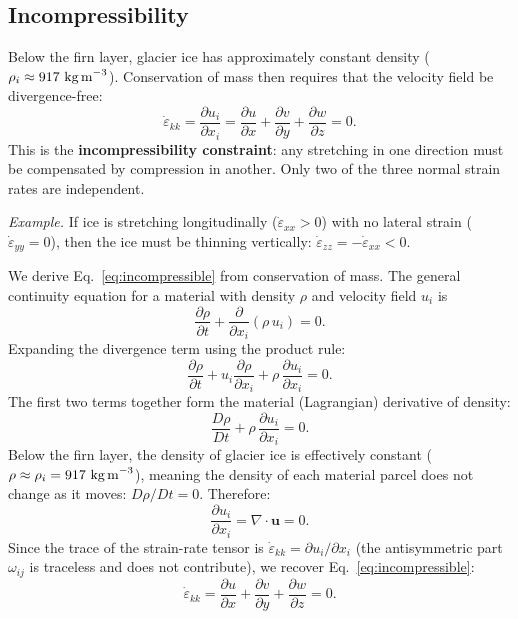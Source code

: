 \documentclass[11pt]{article}
\begin{document}
\subsection{Incompressibility}

Below the firn layer, glacier ice has approximately constant density ($\rho_i \approx 917~\text{kg\,m}^{-3}$).  Conservation of mass then requires that the velocity field be divergence-free:
\begin{equation}
  \boxed{\dot{\varepsilon}_{kk} = \frac{\partial u_i}{\partial x_i} = \frac{\partial u}{\partial x} + \frac{\partial v}{\partial y} + \frac{\partial w}{\partial z} = 0.}
  \label{eq:incompressible}
\end{equation}
This is the \textbf{incompressibility constraint}: any stretching in one direction must be compensated by compression in another.  Only two of the three normal strain rates are independent.

\medskip
\noindent\emph{Example.}  If ice is stretching longitudinally ($\dot{\varepsilon}_{xx} > 0$) with no lateral strain ($\dot{\varepsilon}_{yy} = 0$), then the ice must be thinning vertically: $\dot{\varepsilon}_{zz} = -\dot{\varepsilon}_{xx} < 0$.

\begin{tcolorbox}[
  colback=orange!25,
  colframe=orange!70!black,
  title={\textbf{Derivation: Incompressibility of Glacier Ice}},
  breakable
]
We derive Eq.~\eqref{eq:incompressible} from conservation of mass.  The general continuity equation for a material with density $\rho$ and velocity field $u_i$ is
\begin{equation}
  \frac{\partial \rho}{\partial t} + \frac{\partial}{\partial x_i}(\rho\,u_i) = 0.
\end{equation}
Expanding the divergence term using the product rule:
\begin{equation}
  \frac{\partial \rho}{\partial t} + u_i\frac{\partial \rho}{\partial x_i} + \rho\,\frac{\partial u_i}{\partial x_i} = 0.
\end{equation}
The first two terms together form the material (Lagrangian) derivative of density:
\begin{equation}
  \frac{D\rho}{Dt} + \rho\,\frac{\partial u_i}{\partial x_i} = 0.
\end{equation}
Below the firn layer, the density of glacier ice is effectively constant ($\rho \approx \rho_i = 917~\text{kg\,m}^{-3}$), meaning the density of each material parcel does not change as it moves: $D\rho/Dt = 0$.  Therefore:
\begin{equation}
  \frac{\partial u_i}{\partial x_i} = \nabla \cdot \bm{u} = 0.
\end{equation}
Since the trace of the strain-rate tensor is $\dot{\varepsilon}_{kk} = \partial u_i / \partial x_i$ (the antisymmetric part $\omega_{ij}$ is traceless and does not contribute), we recover Eq.~\eqref{eq:incompressible}:
\begin{equation}
  \boxed{\dot{\varepsilon}_{kk} = \frac{\partial u}{\partial x} + \frac{\partial v}{\partial y} + \frac{\partial w}{\partial z} = 0.}
\end{equation}
\end{tcolorbox}
\end{document}
